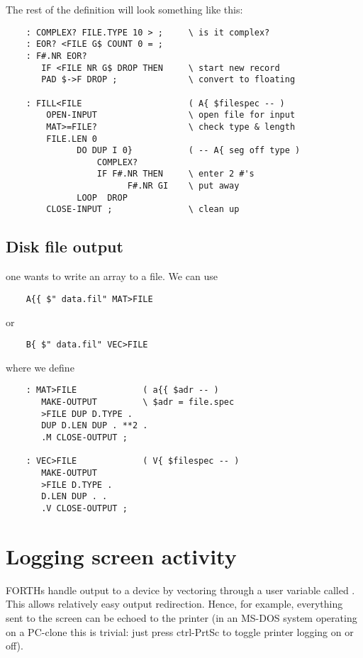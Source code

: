 The rest of the definition will look something like this:

\begin{lstlisting}
    : COMPLEX? FILE.TYPE 10 > ;     \ is it complex?
    : EOR? <FILE G$ COUNT 0 = ;
    : F#.NR EOR?
       IF <FILE NR G$ DROP THEN     \ start new record
       PAD $->F DROP ;              \ convert to floating

    : FILL<FILE                     ( A{ $filespec -- )
        OPEN-INPUT                  \ open file for input
        MAT>=FILE?                  \ check type & length
        FILE.LEN 0
              DO DUP I 0}           ( -- A{ seg off type )
                  COMPLEX?
                  IF F#.NR THEN     \ enter 2 #'s
                        F#.NR GI    \ put away
              LOOP  DROP
        CLOSE-INPUT ;               \ clean up
\end{lstlisting}

\subsection{Disk file output}

 one wants to write an array to a file.
We can use

\begin{lstlisting}
    A{{ $" data.fil" MAT>FILE
\end{lstlisting}
or
\begin{lstlisting}
    B{ $" data.fil" VEC>FILE
\end{lstlisting}

where we define

\begin{lstlisting}
    : MAT>FILE             ( a{{ $adr -- )
       MAKE-OUTPUT         \ $adr = file.spec
       >FILE DUP D.TYPE .
       DUP D.LEN DUP . **2 .
       .M CLOSE-OUTPUT ;

    : VEC>FILE             ( V{ $filespec -- )
       MAKE-OUTPUT
       >FILE D.TYPE .
       D.LEN DUP . .
       .V CLOSE-OUTPUT ;
\end{lstlisting}

\section{Logging screen activity}
 FORTHs handle output to a device by vectoring through a user variable called . This allows relatively easy output redirection. Hence, for example, everything sent to the screen can be echoed to the printer (in an MS-DOS system operating on a PC-clone this is trivial: just press ctrl-PrtSc to toggle printer logging on or off).

